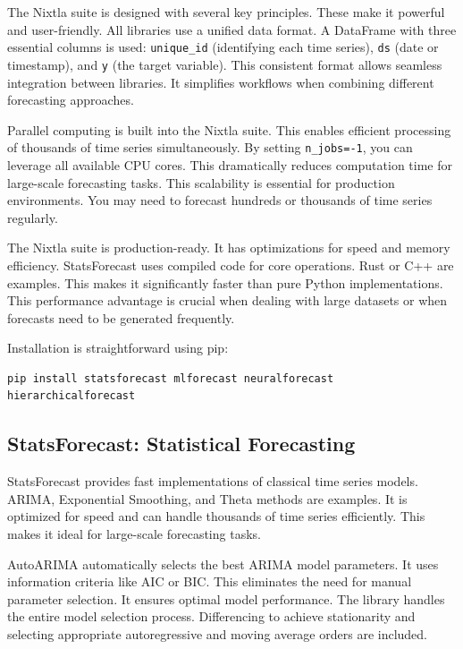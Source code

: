The Nixtla suite is designed with several key principles. These make it powerful and user-friendly. All libraries use a unified data format. A DataFrame with three essential columns is used: \texttt{unique\_id} (identifying each time series), \texttt{ds} (date or timestamp), and \texttt{y} (the target variable). This consistent format allows seamless integration between libraries. It simplifies workflows when combining different forecasting approaches.

Parallel computing is built into the Nixtla suite. This enables efficient processing of thousands of time series simultaneously. By setting \texttt{n\_jobs=-1}, you can leverage all available CPU cores. This dramatically reduces computation time for large-scale forecasting tasks. This scalability is essential for production environments. You may need to forecast hundreds or thousands of time series regularly.

The Nixtla suite is production-ready. It has optimizations for speed and memory efficiency. StatsForecast uses compiled code for core operations. Rust or C++ are examples. This makes it significantly faster than pure Python implementations. This performance advantage is crucial when dealing with large datasets or when forecasts need to be generated frequently.

Installation is straightforward using pip:

\begin{verbatim}
pip install statsforecast mlforecast neuralforecast hierarchicalforecast
\end{verbatim}

\subsection{StatsForecast: Statistical Forecasting}

StatsForecast provides fast implementations of classical time series models. ARIMA, Exponential Smoothing, and Theta methods are examples. It is optimized for speed and can handle thousands of time series efficiently. This makes it ideal for large-scale forecasting tasks.

AutoARIMA automatically selects the best ARIMA model parameters. It uses information criteria like AIC or BIC. This eliminates the need for manual parameter selection. It ensures optimal model performance. The library handles the entire model selection process. Differencing to achieve stationarity and selecting appropriate autoregressive and moving average orders are included.

